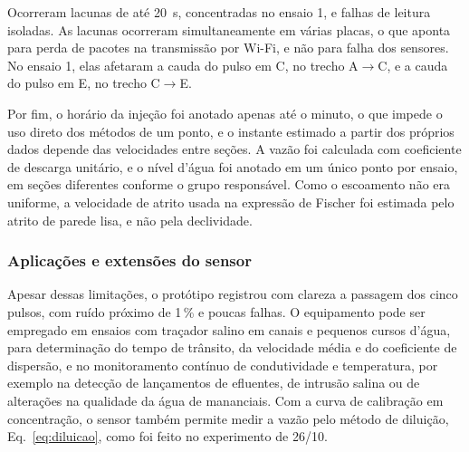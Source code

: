 \documentclass[12pt,a4paper]{article}
\begin{document}
Ocorreram lacunas de até 20~s, concentradas no ensaio 1, e falhas de leitura isoladas. As lacunas ocorreram simultaneamente em várias placas, o que aponta para perda de pacotes na transmissão por Wi-Fi, e não para falha dos sensores. No ensaio 1, elas afetaram a cauda do pulso em C, no trecho A$\rightarrow$C, e a cauda do pulso em E, no trecho C$\rightarrow$E.

Por fim, o horário da injeção foi anotado apenas até o minuto, o que impede o uso direto dos métodos de um ponto, e o instante estimado a partir dos próprios dados depende das velocidades entre seções. A vazão foi calculada com coeficiente de descarga unitário, e o nível d'água foi anotado em um único ponto por ensaio, em seções diferentes conforme o grupo responsável. Como o escoamento não era uniforme, a velocidade de atrito usada na expressão de Fischer foi estimada pelo atrito de parede lisa, e não pela declividade.

\subsubsection{Aplicações e extensões do sensor}
\label{sec:res_aplicacoes}

Apesar dessas limitações, o protótipo registrou com clareza a passagem dos cinco pulsos, com ruído próximo de 1\,\% e poucas falhas. O equipamento pode ser empregado em ensaios com traçador salino em canais e pequenos cursos d'água, para determinação do tempo de trânsito, da velocidade média e do coeficiente de dispersão, e no monitoramento contínuo de condutividade e temperatura, por exemplo na detecção de lançamentos de efluentes, de intrusão salina ou de alterações na qualidade da água de mananciais. Com a curva de calibração em concentração, o sensor também permite medir a vazão pelo método de diluição, Eq.~\eqref{eq:diluicao}, como foi feito no experimento de 26/10.
\end{document}
